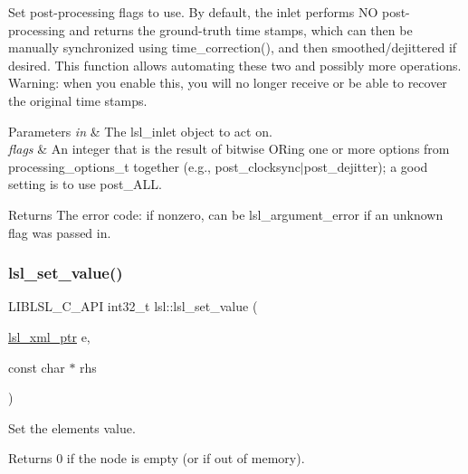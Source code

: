Set post-\/processing flags to use. By default, the inlet performs NO post-\/processing and returns the ground-\/truth time stamps, which can then be manually synchronized using time\+\_\+correction(), and then smoothed/dejittered if desired. This function allows automating these two and possibly more operations. Warning\+: when you enable this, you will no longer receive or be able to recover the original time stamps. 
\begin{DoxyParams}{Parameters}
{\em in} & The lsl\+\_\+inlet object to act on. \\
\hline
{\em flags} & An integer that is the result of bitwise OR\textquotesingle{}ing one or more options from processing\+\_\+options\+\_\+t together (e.\+g., post\+\_\+clocksync$\vert$post\+\_\+dejitter); a good setting is to use post\+\_\+\+A\+LL. \\
\hline
\end{DoxyParams}
\begin{DoxyReturn}{Returns}
The error code\+: if nonzero, can be lsl\+\_\+argument\+\_\+error if an unknown flag was passed in. 
\end{DoxyReturn}
\mbox{\label{namespacelsl_ab072800f46e425c22568529419a3301b}} 
\subsubsection{\texorpdfstring{lsl\+\_\+set\+\_\+value()}{lsl\_set\_value()}}
{\footnotesize\ttfamily L\+I\+B\+L\+S\+L\+\_\+\+C\+\_\+\+A\+PI int32\+\_\+t lsl\+::lsl\+\_\+set\+\_\+value (\begin{DoxyParamCaption}\item[{\hyperlink{namespacelsl_a5edc7a49a1a1be1634fe6dce3d59c59b}{lsl\+\_\+xml\+\_\+ptr}}]{e,  }\item[{const char $\ast$}]{rhs }\end{DoxyParamCaption})}

Set the element\textquotesingle{}s value. \begin{DoxyReturn}{Returns}
0 if the node is empty (or if out of memory). 
\end{DoxyReturn}
\mbox{\label{namespacelsl_a71b6f856d04b6519ab6b249499ad4e91}} 
